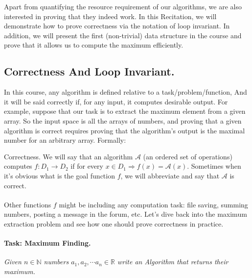   Apart from quantifying the resource requirement of our algorithms, we are also interested in proving that they indeed work. In this Recitation, we will demonstrate how to prove correctness via the notation of loop invariant. In addition, we will present the first (non-trivial) data structure in the course and prove that it allows us to compute the maximum efficiently.



\subsection*{Correctness And Loop Invariant.}
In this course, any algorithm is defined relative to a task/problem/function, And it will be said correctly if, for any input, it computes desirable output. For example, suppose that our task is to extract the maximum element from a given array. 
So the input space is all the arrays of numbers, and proving that a given algorithm is correct requires proving that the algorithm's output is the maximal number for an arbitrary array. Formally:  
\begin{defbox}{Correctness.}
We will say that an algorithm \( \mathcal{A}\) (an ordered set of operations) computes \( f:D_1 \rightarrow D_2 \) if for every \(x \in D_1 \Rightarrow f(x) = \mathcal{A}(x)\). Sometimes when it's obvious what is the goal function \(f\), we will abbreviate and say that \( \mathcal{A}\) is correct.       
\end{defbox}
\paragraph{}
Other functions \(f\) might be including any computation task: file saving, summing numbers, posting a message in the forum, etc. Let's dive back into the maximum extraction problem and see how one should prove correctness in practice.     
\paragraph{Task: Maximum Finding.} \textit{Given $n\in \mathbb{N}$ numbers $a_1, a_2, \cdots a_n \in \mathbb{R}$ write an Algorithm that returns their maximum.} 

